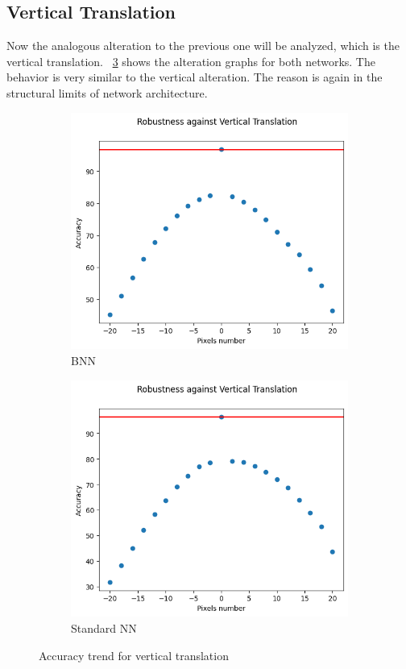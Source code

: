 \subsection{Vertical Translation}

Now the analogous alteration to the previous one will be analyzed, which is the vertical translation. \Fig~\ref{fig:acc_vt_wu} shows the alteration graphs for both networks. The behavior is very similar to the vertical alteration. The reason is again in the structural limits of network architecture.

\begin{figure}[h]
	\centering
	\begin{subfigure}{.5\textwidth}
		\centering
		\includegraphics[width=0.9\linewidth]{ImageFiles/EvalBNN/VT/WU/acc}
		\caption{BNN}
		\label{fig:vt_acc_wu_bnn}
	\end{subfigure}%
	\begin{subfigure}{.5\textwidth}
		\centering
		\includegraphics[width=0.9\linewidth]{ImageFiles/EvalANN/vert_trans_ann}
		\caption{Standard NN}
		\label{fig:vert_trans_ann}
	\end{subfigure}
	\caption{Accuracy trend for vertical translation}
	\label{fig:acc_vt_wu}
\end{figure}

